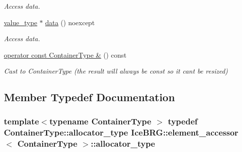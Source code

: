 \begin{DoxyCompactItemize}
\begin{DoxyCompactList}\small\item\em Access data. \end{DoxyCompactList}\item 
\hyperlink{classIceBRG_1_1element__accessor_ab6c9120cd75bb9ea751fab09967baee9}{value\+\_\+type} $\ast$ \hyperlink{classIceBRG_1_1element__accessor_a5cd35360d840d7f443d002951c6a9337}{data} () noexcept
\begin{DoxyCompactList}\small\item\em Access data. \end{DoxyCompactList}\item 
\hyperlink{classIceBRG_1_1element__accessor_a5ddde5b6d5a1e40f3f674cd3a2f8cea3}{operator const Container\+Type \&} () const 
\begin{DoxyCompactList}\small\item\em Cast to Container\+Type (the result will always be const so it can\textquotesingle{}t be resized) \end{DoxyCompactList}\end{DoxyCompactItemize}


\subsection{Member Typedef Documentation}
\hypertarget{classIceBRG_1_1element__accessor_ad50e47085815aadfb3fa84cd845266ba}{}
\subsubsection[{allocator\+\_\+type}]{\setlength{\rightskip}{0pt plus 5cm}template$<$typename Container\+Type $>$ typedef Container\+Type\+::allocator\+\_\+type {\bf Ice\+B\+R\+G\+::element\+\_\+accessor}$<$ Container\+Type $>$\+::{\bf allocator\+\_\+type}}\label{classIceBRG_1_1element__accessor_ad50e47085815aadfb3fa84cd845266ba}
\hypertarget{classIceBRG_1_1element__accessor_ab9a6ca4866a0758171a4ffa7b0935cd2}{}
